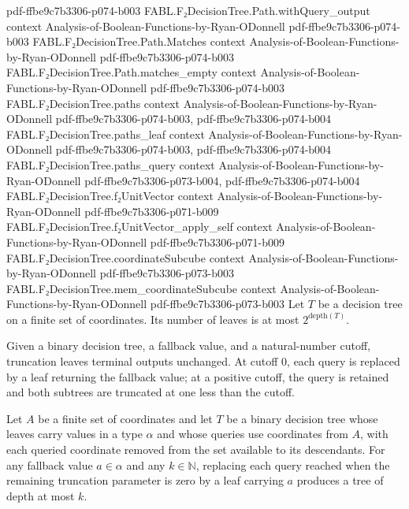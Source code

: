 \begin{theorem}
  {pdf-ffbe9c7b3306-p074-b003}
\proofstep
  {FABL.F₂DecisionTree.Path.withQuery_output}
  {context}
  {Analysis-of-Boolean-Functions-by-Ryan-ODonnell}
  {pdf-ffbe9c7b3306-p074-b003}
\proofstep
  {FABL.F₂DecisionTree.Path.Matches}
  {context}
  {Analysis-of-Boolean-Functions-by-Ryan-ODonnell}
  {pdf-ffbe9c7b3306-p074-b003}
\proofstep
  {FABL.F₂DecisionTree.Path.matches_empty}
  {context}
  {Analysis-of-Boolean-Functions-by-Ryan-ODonnell}
  {pdf-ffbe9c7b3306-p074-b003}
\proofstep
  {FABL.F₂DecisionTree.paths}
  {context}
  {Analysis-of-Boolean-Functions-by-Ryan-ODonnell}
  {pdf-ffbe9c7b3306-p074-b003,
    pdf-ffbe9c7b3306-p074-b004}
\proofstep
  {FABL.F₂DecisionTree.paths_leaf}
  {context}
  {Analysis-of-Boolean-Functions-by-Ryan-ODonnell}
  {pdf-ffbe9c7b3306-p074-b003,
    pdf-ffbe9c7b3306-p074-b004}
\proofstep
  {FABL.F₂DecisionTree.paths_query}
  {context}
  {Analysis-of-Boolean-Functions-by-Ryan-ODonnell}
  {pdf-ffbe9c7b3306-p073-b004,
    pdf-ffbe9c7b3306-p074-b004}
\proofstep
  {FABL.F₂DecisionTree.f₂UnitVector}
  {context}
  {Analysis-of-Boolean-Functions-by-Ryan-ODonnell}
  {pdf-ffbe9c7b3306-p071-b009}
\proofstep
  {FABL.F₂DecisionTree.f₂UnitVector_apply_self}
  {context}
  {Analysis-of-Boolean-Functions-by-Ryan-ODonnell}
  {pdf-ffbe9c7b3306-p071-b009}
\proofstep
  {FABL.F₂DecisionTree.coordinateSubcube}
  {context}
  {Analysis-of-Boolean-Functions-by-Ryan-ODonnell}
  {pdf-ffbe9c7b3306-p073-b003}
\proofstep
  {FABL.F₂DecisionTree.mem_coordinateSubcube}
  {context}
  {Analysis-of-Boolean-Functions-by-Ryan-ODonnell}
  {pdf-ffbe9c7b3306-p073-b003}
Let $T$ be a decision tree on a finite set of coordinates. Its number of leaves is at
most $2^{\mathrm{depth}(T)}$.
\end{theorem}

\begin{definition}
\leanok
{}
Given a binary decision tree, a fallback value, and a natural-number cutoff, truncation
leaves terminal outputs unchanged. At cutoff $0$, each query is replaced by a leaf
returning the fallback value; at a positive cutoff, the query is retained and both
subtrees are truncated at one less than the cutoff.
\end{definition}

\begin{theorem}
\leanok
{}
Let $A$ be a finite set of coordinates and let $T$ be a binary decision tree whose
leaves carry values in a type $\alpha$ and whose queries use coordinates from $A$, with
each queried coordinate removed from the set available to its descendants. For any
fallback value $a \in \alpha$ and any $k \in \mathbb{N}$, replacing each query reached
when the remaining truncation parameter is zero by a leaf carrying $a$ produces a tree
of depth at most $k$.
\end{theorem}

